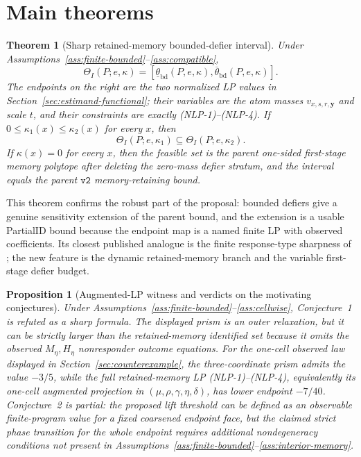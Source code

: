 \documentclass[11pt]{article}
\theoremstyle{definition}
\theoremstyle{plain}
\newtheorem{theorem}{Theorem}
\newtheorem{proposition}{Proposition}
\theoremstyle{remark}
\begin{document}
\section{Main theorems}
\begin{theorem}[Sharp retained-memory bounded-defier interval]\label{thm:sharp-bd}
Under Assumptions~\ref{ass:finite-bounded}--\ref{ass:compatible},
\[
\Theta_I(P;e,\kappa)=
[\underline\theta_{\mathrm{bd}}(P,e,\kappa),
\overline\theta_{\mathrm{bd}}(P,e,\kappa)].
\]
The endpoints on the right are the two normalized LP values in Section~\ref{sec:estimand-functional}; their variables are the atom masses \(v_{x,s,r,\mathbf y}\) and scale \(t\), and their constraints are exactly (NLP-1)--(NLP-4).
If \(0\le\kappa_1(x)\le\kappa_2(x)\) for every \(x\), then
\[
\Theta_I(P;e,\kappa_1)\subseteq \Theta_I(P;e,\kappa_2).
\]
If \(\kappa(x)=0\) for every \(x\), then the feasible set is the parent one-sided first-stage memory polytope after deleting the zero-mass defier stratum, and the interval equals the parent \(\texttt{v2}\) memory-retaining bound.
\end{theorem}

This theorem confirms the robust part of the proposal: bounded defiers give a genuine sensitivity extension of the parent bound, and the extension is a usable PartialID bound because the endpoint map is a named finite LP with observed coefficients.
Its closest published analogue is the finite response-type sharpness of \cite{BalkePearl1997}; the new feature is the dynamic retained-memory branch and the variable first-stage defier budget.

\begin{proposition}[Augmented-LP witness and verdicts on the motivating conjectures]\label{prop:verdicts}
Under Assumptions~\ref{ass:finite-bounded}--\ref{ass:cellwise}, Conjecture~1 is refuted as a sharp formula.
The displayed prism is an outer relaxation, but it can be strictly larger than the retained-memory identified set because it omits the observed \(M_\eta,H_\eta\) nonresponder outcome equations.
For the one-cell observed law displayed in Section~\ref{sec:counterexample}, the three-coordinate prism admits the value \(-3/5\), while the full retained-memory LP (NLP-1)--(NLP-4), equivalently its one-cell augmented projection in \((\mu,\rho,\gamma,\eta,\delta)\), has lower endpoint \(-7/40\).
Conjecture~2 is partial: the proposed lift threshold can be defined as an observable finite-program value for a fixed coarsened endpoint face, but the claimed strict phase transition for the whole endpoint requires additional nondegeneracy conditions not present in Assumptions~\ref{ass:finite-bounded}--\ref{ass:interior-memory}.
\end{proposition}
\end{document}
